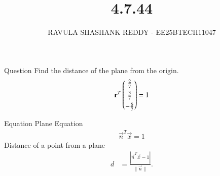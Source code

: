 \documentclass{beamer}
\title %
{4.7.44}
\author %
{RAVULA SHASHANK REDDY - EE25BTECH11047}
\begin{document}
	
	
	\frame{\titlepage}
	\begin{frame}{Question}
Find the distance of the plane from the origin.
\begin{align*}
\mathbf{r}^T\begin{pmatrix}\tfrac{2}{7}\\[4pt]\tfrac{3}{7}\\[4pt]-\tfrac{6}{7}\end{pmatrix} = 1
\end{align*}

\end{frame}
\begin{frame}{Equation}
Plane Equation
\begin{align*}
    \vec{n}^T\vec{x}=1
\end{align*}
 Distance of a point from a plane
 \begin{align*}
      d &= \frac{|\vec{n}^T \vec{x} - 1|}{\|\vec{n}\|}.
 \end{align*}
\end{frame}
\end{document}
